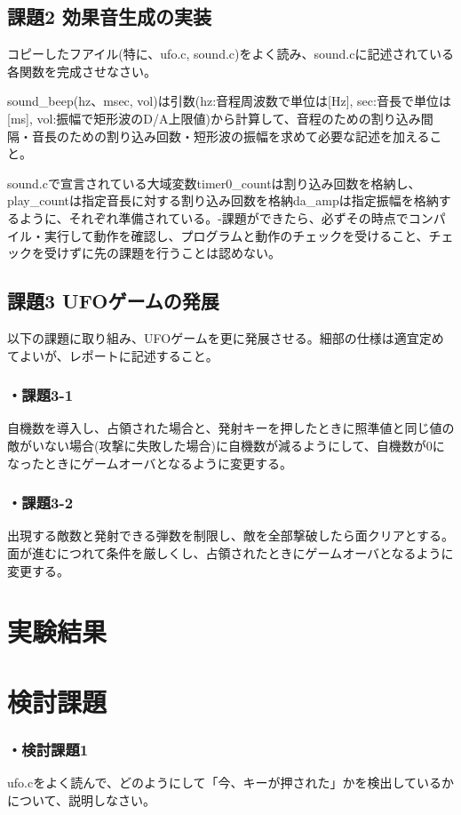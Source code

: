 ﻿\documentclass{jarticle}
\begin{document}
\subsection{課題2 効果音生成の実装}
コピーしたフアイル(特に、ufo.c, sound.c)をよく読み、sound.cに記述されている各関数を完成させなさい。


sound\_beep(hz、msec, vol)は引数(hz:音程周波数で単位は[Hz], sec:音長で単位は[ms], vol:振幅で矩形波のD/A上限値)から計算して、音程のための割り込み間隔・音長のための割り込み回数・短形波の振幅を求めて必要な記述を加えること。


sound.cで宣言されている大域変数timer0\_countは割り込み回数を格納し、play\_countは指定音長に対する割り込み回数を格納da\_ampは指定振幅を格納するように、それぞれ準備されている。-課題ができたら、必ずその時点でコンパイル・実行して動作を確認し、プログラムと動作のチェックを受けること、チェックを受けずに先の課題を行うことは認めない。


\subsection{課題3 UFOゲームの発展}
以下の課題に取り組み、UFOゲームを更に発展させる。細部の仕様は適宜定めてよいが、レポートに記述すること。
\subsubsection*{・課題3-1}
自機数を導入し、占領された場合と、発射キーを押したときに照準値と同じ値の敵がいない場合(攻撃に失敗した場合)に自機数が減るようにして、自機数が0になったときにゲームオーバとなるように変更する。
\subsubsection*{・課題3-2}
出現する敵数と発射できる弾数を制限し、敵を全部撃破したら面クリアとする。面が進むにつれて条件を厳しくし、占領されたときにゲームオーバとなるように変更する。


\section{実験結果}


\section{検討課題}
\subsubsection*{・検討課題1}
ufo.cをよく読んで、どのようにして「今、キーが押された」かを検出しているかについて、説明しなさい。
\end{document}
